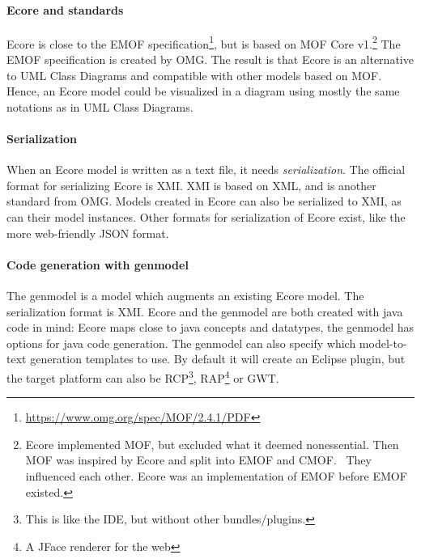 \paragraph*{Ecore and standards}
\Gls{Ecore} is close to the \acrfull{EMOF} specification\footnote{\href{https://www.omg.org/spec/MOF/2.4.1/PDF}{https://www.omg.org/spec/MOF/2.4.1/PDF}}, but is based on MOF Core v1.\footnote{Ecore implemented MOF, but excluded what it deemed nonessential.
Then MOF was inspired by Ecore and split into \acrshort{EMOF} and CMOF.~\cite{merksMerksMeanderingsEMF2007} They influenced each other. 
Ecore was an implementation of \acrshort{EMOF} before \acrshort{EMOF} existed.}
The \acrshort{EMOF} specification is created by \acrfull{OMG}.
The result is that \gls{Ecore} is an alternative to \gls{UML} Class Diagrams and compatible with other models based on MOF.
Hence, an \gls{Ecore} model could be visualized in a diagram using mostly the same notations as in \gls{UML} Class Diagrams.

\paragraph*{Serialization} When an \gls{Ecore} model is written as a text file, it needs \textit{serialization}.
The official format for serializing Ecore is \acrfull{XMI}.
\Acrshort{XMI} is based on XML, and is another standard from \acrshort{OMG}.
Models created in \gls{Ecore} can also be serialized to \acrshort{XMI}, as can their model instances.
Other formats for serialization of \gls{Ecore} exist, like the more web-friendly \gls{JSON} format.


\paragraph*{Code generation with genmodel}
The genmodel is a model which augments an existing \gls{Ecore} model.
The serialization format is \acrshort{XMI}.
Ecore and the genmodel are both created with java code in mind: Ecore maps close to java concepts and datatypes, the genmodel has options for java code generation.
The genmodel can also specify which model-to-text generation templates to use.
By default it will create an \gls{Eclipse} plugin, but the target platform can also be \acrfull{RCP}\footnote{This is like the \acrshort{IDE}, but without other bundles/plugins.}, \acrfull{RAP}\footnote{A JFace renderer for the web} or \acrfull{GWT}.


